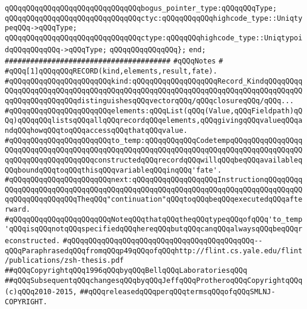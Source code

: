 \newline
\verb|qQQqqQQqqQQqqQQqqQQqqQQqqQQqqQQqbogus_pointer_type:qQQqqQQqType;|\newline
\newline
\verb|qQQqqQQqqQQqqQQqqQQqqQQqqQQqqQQqctyc:qQQqqQQqqQQqhighcode_type::UniqtypeqQQq->qQQqType;|\newline
\verb|qQQqqQQqqQQqqQQqqQQqqQQqqQQqqQQqctype:qQQqqQQqhighcode_type::UniqtypoidqQQqqQQqqQQq->qQQqType;|\newline
\verb|qQQqqQQqqQQqqQQq};|\newline
\verb|end;|\newline
\newline
\verb|#######################################|\newline
\verb|#qQQqNotes|\newline
\verb|#|\newline
\verb|#qQQq[1]qQQqqQQqRECORD(kind,elements,result,fate).|\newline
\verb|#qQQqqQQqqQQqqQQqqQQqqQQqkind:qQQqqQQqqQQqqQQqqQQqRecord_KindqQQqqQQqqQQqqQQqqQQqqQQqqQQqqQQqqQQqqQQqqQQqqQQqqQQqqQQqqQQqqQQqqQQqqQQqqQQqqQQqqQQqqQQqqQQqqQQqdistinguishesqQQqvectorqQQq/qQQqclosureqQQq/qQQq...|\newline
\verb|#qQQqqQQqqQQqqQQqqQQqqQQqelements:qQQqList(qQQq(Value,qQQqFieldpath)qQQq)qQQqqQQqlistsqQQqallqQQqrecordqQQqelements,qQQqgivingqQQqvalueqQQqandqQQqhowqQQqtoqQQqaccessqQQqthatqQQqvalue.|\newline
\verb|#qQQqqQQqqQQqqQQqqQQqqQQqto_temp:qQQqqQQqqQQqCodetempqQQqqQQqqQQqqQQqqQQqqQQqqQQqqQQqqQQqqQQqqQQqqQQqqQQqqQQqqQQqqQQqqQQqqQQqqQQqqQQqqQQqqQQqqQQqqQQqqQQqqQQqqQQqconstructedqQQqrecordqQQqwillqQQqbeqQQqavailableqQQqboundqQQqtoqQQqthisqQQqvariableqQQqinqQQq'fate'.|\newline
\verb|#qQQqqQQqqQQqqQQqqQQqqQQqnext:qQQqqQQqqQQqqQQqqQQqInstructionqQQqqQQqqQQqqQQqqQQqqQQqqQQqqQQqqQQqqQQqqQQqqQQqqQQqqQQqqQQqqQQqqQQqqQQqqQQqqQQqqQQqqQQqqQQqqQQqTheqQQq"continuation"qQQqtoqQQqbeqQQqexecutedqQQqafterward.|\newline
\verb|#qQQqqQQqqQQqqQQqqQQqqQQqNoteqQQqthatqQQqtheqQQqtypeqQQqofqQQq'to_temp'qQQqisqQQqnotqQQqspecifiedqQQqhereqQQqbutqQQqcanqQQqalwaysqQQqbeqQQqreconstructed.|\newline
\verb|#qQQqqQQqqQQqqQQqqQQqqQQqqQQqqQQqqQQqqQQqqQQq--qQQqParaphrasedqQQqfromqQQqp49qQQqofqQQqhttp://flint.cs.yale.edu/flint/publications/zsh-thesis.pdf|\newline
\newline
\verb|##qQQqCopyrightqQQq1996qQQqbyqQQqBellqQQqLaboratoriesqQQq|\newline
\verb|##qQQqSubsequentqQQqchangesqQQqbyqQQqJeffqQQqProtheroqQQqCopyrightqQQq(c)qQQq2010-2015,|\newline
\verb|##qQQqreleasedqQQqperqQQqtermsqQQqofqQQqSMLNJ-COPYRIGHT.|\newline

